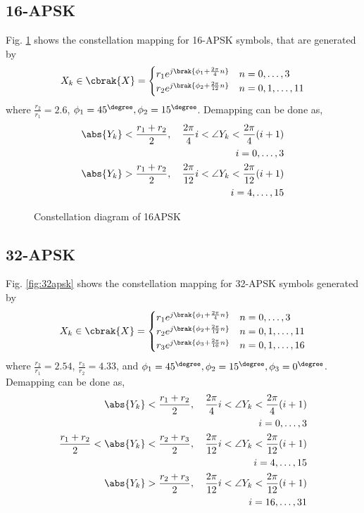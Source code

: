 \documentclass[journal,12pt,twocolumn]{IEEEtran}
\begin{document}
\subsection{16-APSK}
Fig. \ref{fig:16apsk} shows the constellation mapping for 16-APSK symbols, that are generated by
\begin{equation}
X_k \in \cbrak{X}=
\begin{cases}
r_1 e^{j\brak{\phi_1+\frac{2\pi}{4}n}}& n=0,\dots,3\\
r_2 e^{j\brak{\phi_2+\frac{2\pi}{12}n}}& n=0,1,\dots,11
\end{cases}
\end{equation}
%
where $\frac{r_2}{r_1}=2.6$, $\phi_1=45^{\degree},\phi_2=15^{\degree}$.
Demapping can be done as,
\begin{align}
\abs{Y_k}<\frac{r_1+r_2}{2},  \quad  \frac{2\pi }{4}i < \angle{Y_k} < \frac{2\pi }{4}(i+1)
\\
\quad i=0,\dots,3\\
\abs{Y_k}>\frac{r_1+r_2}{2},\quad    \frac{2\pi }{12}i < \angle{Y_k} < \frac{2\pi }{12}(i+1)\\
i=4,\dots,15
\end{align}
%
\begin{figure}[!ht]
\begin{center}
\resizebox{\columnwidth}{!}{}
\end{center}
\caption{Constellation diagram of 16APSK}
\label{fig:16apsk}
\end{figure}
%
%
\subsection{32-APSK}
Fig. \ref{fig:32apsk} shows the constellation mapping for 32-APSK symbols 
generated by
\begin{equation}
X_k \in \cbrak{X}=
\begin{cases}
r_1 e^{j\brak{\phi_1+\frac{2\pi}{4}n}}& n=0,\dots,3\\
r_2 e^{j\brak{\phi_2+\frac{2\pi}{12}n}}& n=0,1,\dots,11\\
r_3 e^{j\brak{\phi_3+\frac{2\pi}{16}n}}& n=0,1,\dots,16
\end{cases}
\end{equation}
where $\frac{r_2}{r_1}=2.54$, $\frac{r_3}{r_2}=4.33$, and $\phi_1=45^{\degree},\phi_2=15^{\degree},\phi_3=0^{\degree}$.
Demapping can be done as,
\begin{align}
\abs{Y_k}<\frac{r_1+r_2}{2}, \quad  \frac{2\pi }{4}i < \angle{Y_k} < \frac{2\pi }{4}(i+1)\\
 i=0,\dots,3\\
\frac{r_1+r_2}{2}<\abs{Y_k}<\frac{r_2+r_3}{2}, \quad   \frac{2\pi }{12}i < \angle{Y_k} < \frac{2\pi }{12}(i+1)\\
 i=4,\dots,15 \\ 
\abs{Y_k}>\frac{r_2+r_3}{2}, \quad  \frac{2\pi }{12}i < \angle{Y_k} < \frac{2\pi }{12}(i+1)\\
 i=16,\dots,31
\end{align}
\end{document}
